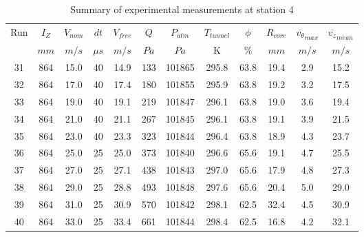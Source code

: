 \begin{table}[H]
\begin{center}
\begin{tabular}{|cccccccccccc|}
	\hline
	Run & $I_Z$ & $V_{nom}$ & $dt$ & $V_{free}$ & $Q$ & $P_{atm}$ & $T_{tunnel}$ & $\phi$ & $R_{core}$ & $\overline{v_{\theta}}_{max}$ & $\overline{v_{z}}_{mean}$\\
	  & $mm$ & $m/s$ & $\mu s$ & $m/s$ & $Pa$ & $Pa$ & K & $\%$ & $mm$ & $m/s$ & $m/s$\\
	\hline
	31 & 864 & 15.0 & 40 & 14.9 & 133 & 101865 & 295.8 & 63.8 & 19.4 & 2.9 & 15.2\\
	32 & 864 & 17.0 & 40 & 17.4 & 180 & 101855 & 295.9 & 63.8 & 19.2 & 3.2 & 17.5\\
	33 & 864 & 19.0 & 40 & 19.1 & 219 & 101847 & 296.1 & 63.8 & 19.0 & 3.6 & 19.4\\
	34 & 864 & 21.0 & 40 & 21.1 & 267 & 101845 & 296.1 & 63.8 & 19.1 & 3.9 & 21.5\\
	35 & 864 & 23.0 & 40 & 23.3 & 323 & 101844 & 296.4 & 63.8 & 18.9 & 4.3 & 23.7\\
	36 & 864 & 25.0 & 25 & 25.0 & 373 & 101840 & 296.6 & 65.6 & 19.1 & 4.7 & 25.5\\
	37 & 864 & 27.0 & 25 & 27.1 & 438 & 101843 & 297.0 & 65.6 & 17.9 & 4.8 & 27.3\\
	38 & 864 & 29.0 & 25 & 28.8 & 493 & 101848 & 297.6 & 65.6 & 20.4 & 5.0 & 29.0\\
	39 & 864 & 31.0 & 25 & 30.9 & 570 & 101842 & 298.1 & 62.5 & 32.4 & 4.5 & 30.9\\
	40 & 864 & 33.0 & 25 & 33.4 & 661 & 101844 & 298.4 & 62.5 & 16.8 & 4.2 & 32.1\\
	\hline
\end{tabular}
\caption{Summary of experimental measurements at station 4}
\label{table:experiment_results_4}
\end{center}
\end{table}

